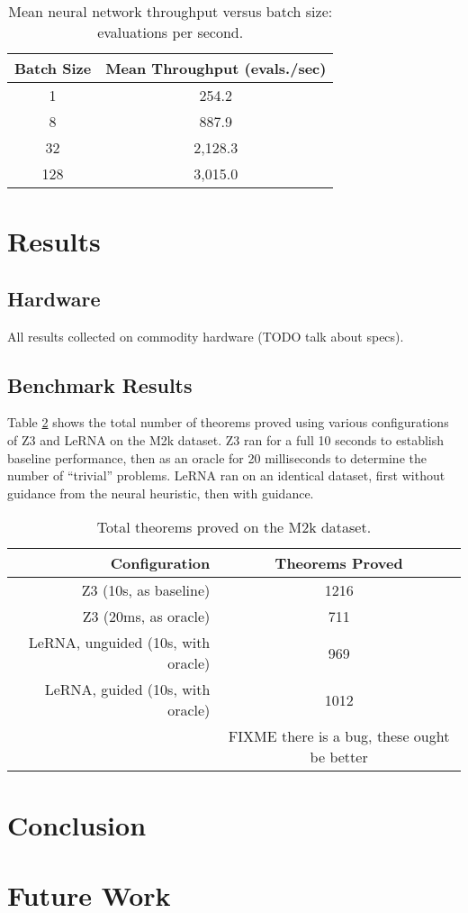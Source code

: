 \documentclass[runningheads]{llncs}
\begin{document}
\begin{table}
	\caption{Mean neural network throughput versus batch size: evaluations per second.}
	\centering
	\begin{tabular}{c | c}
		\textbf{Batch Size} & \textbf{Mean Throughput (evals./sec)}\\
		\hline
		1 & 254.2\\
		8 & 887.9\\
		32 & 2,128.3\\
		128 & 3,015.0\\
	\end{tabular}
	\label{table:network-throughput}
\end{table}

\section{Results}
\subsection{Hardware}
All results collected on commodity hardware (TODO talk about specs).

\subsection{Benchmark Results}

Table \ref{table:m2k-results} shows the total number of theorems proved using various configurations of Z3 and LeRNA on the M2k dataset.
Z3 ran for a full 10 seconds to establish baseline performance, then as an oracle for 20 milliseconds to determine the number of ``trivial'' problems.
LeRNA ran on an identical dataset, first without guidance from the neural heuristic, then with guidance.

\begin{table}
	\caption{Total theorems proved on the M2k dataset.}
	\centering
	\begin{tabular}{r | c}
		\textbf{Configuration} & \textbf{Theorems Proved}\\
		\hline
		Z3 (10s, as baseline) & 1216\\
		Z3 (20ms, as oracle) & 711\\
		LeRNA, unguided (10s, with oracle) & 969\\
		LeRNA, guided (10s, with oracle) & 1012\\
						      & FIXME there is a bug, these ought be better\\
	\end{tabular}
	\label{table:m2k-results}
\end{table}

\section{Conclusion}
\section{Future Work}



\end{document}

